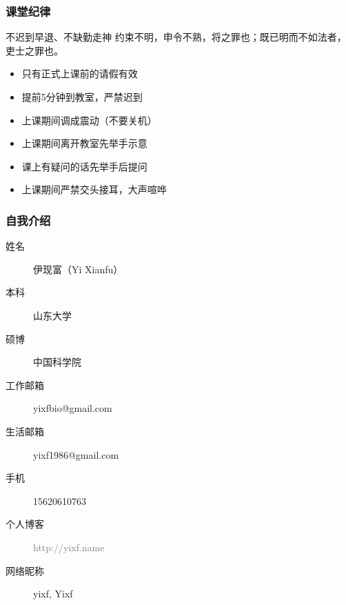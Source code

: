 \begin{frame}
  \frametitle{课堂纪律}
  \begin{alertblock}{不迟到早退、不缺勤走神}
  约束不明，申令不熟，将之罪也；既已明而不如法者，吏士之罪也。
  \end{alertblock}
  \pause
  \begin{itemize}
    \item 只有正式上课前的请假有效
    \item 提前5分钟到教室，严禁迟到
    \item 上课期间调成震动（不要关机）
    \item 上课期间离开教室先举手示意
    \item 课上有疑问的话先举手后提问
    \item 上课期间严禁交头接耳，大声喧哗
  \end{itemize}
\end{frame}

\begin{frame}
  \frametitle{自我介绍}
    \begin{description}
      \item[姓\qquad 名]伊现富（Yi Xianfu）
      \item[本\qquad 科]山东大学
      \item[硕\qquad 博]中国科学院
      \item[工作邮箱]\alert{yixfbio@gmail.com}
      \item[生活邮箱]yixf1986@gmail.com
      \item[手\qquad 机]\alert{15620610763}
      \item[个人博客]\textcolor{gray}{http://yixf.name}
      \item[网络昵称]yixf, Yixf
    \end{description}
\end{frame}

